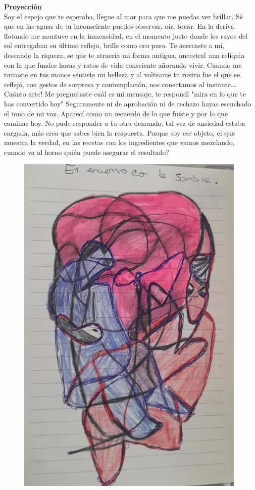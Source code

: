 \documentclass[12pt, a4paper, twoside]{book} %
\begin{document}
\noindent\textbf{Proyección}\\
Soy el espejo que te esperaba, llegue al mar para que me puedas ver brillar, Sé que en las aguas de tu inconsciente puedes observar, oír, tocar.
En la deriva flotando me mantuve en la inmensidad, en el momento justo donde los rayos del sol entregaban su último reflejo, brille como oro puro.
Te acercaste a mí, deseando la riqueza, se que te atraeria mi forma antigua, ancestral una reliquia con la que fundes horas y ratos de vida consciente añorando vivir.
Cuando me tomaste en tus manos sentiste mi belleza y al volteame tu rostro fue el que se reflejó, con gestos de sorpresa y contemplación, nos conectamos al instante... Cuánto arte!
Me preguntaste cuál es mi mensaje, te respondí "mira en lo que te has convertido hoy"
Seguramente ni de aprobación ni de rechazo hayas escuchado el tono de mi voz.
Aparecí como un recuerdo de lo que fuiste y por lo que caminas hoy.
No pude responder a tu otra demanda, tal vez de ansiedad estaba cargada, más creo que sabes bien la respuesta.
Porque soy ese objeto, el que muestra la verdad, en las recetas con los ingredientes que vamos mezclando, cuando va al horno  quién puede asegurar el resultado?

\begin{figure}[H]
	\centering
	\includegraphics[width=\textwidth]{./images/1f81324df25232.jpg}
\end{figure}
\end{document}
